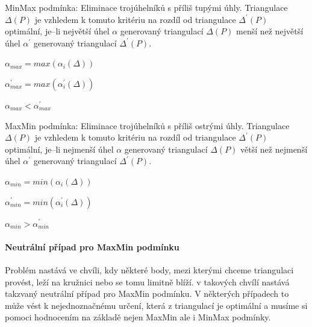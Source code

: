 \documentclass[12pt,a4paper]{article}
\begin{document}
MinMax podmínka:
Eliminace trojúhelníků s příliš tupými úhly. Triangulace $\Delta(P)$ je vzhledem k tomuto kritériu na rozdíl od triangulace $\Delta^{'}(P)$ optimální, je–li největší úhel $\alpha$ generovaný triangulací $\Delta(P)$ menší než největší úhel $\alpha^{'}$ generovaný triangulací $\Delta^{'}(P)$.

$\alpha_{max} = max(\alpha_i(\Delta))$

$\alpha^{'}_{max} = max(\alpha_i^{'}(\Delta))$

$\alpha_{max} < \alpha^{'}_{max}$

\bigskip
MaxMin podmínka:
Eliminace trojúhelníků s příliš ostrými úhly. Triangulace $\Delta(P)$ je vzhledem k tomuto kritériu na rozdíl od triangulace $\Delta^{'}(P)$ optimální, je–li nejmenší úhel $\alpha$ generovaný triangulací $\Delta(P)$ větší než nejmenší úhel $\alpha^{'}$ generovaný triangulací $\Delta^{'}(P)$.

$\alpha_{min} = min(\alpha_i(\Delta))$

$\alpha^{'}_{min} = min(\alpha_i^{'}(\Delta))$

$\alpha_{min} > \alpha^{'}_{min}$

\paragraph{Neutrální případ pro MaxMin podmínku}

Problém nastává ve chvíli, kdy některé body, mezi kterými chceme triangulaci provést, leží na kružnici nebo se tomu limitně blíží. v takových chvílí nastává takzvaný neutrální případ pro MaxMin podmínku. V některých případech to může vést k nejednoznačnému určení, která z triangulací je optimální a musíme si pomoci hodnocením na základě nejen MaxMin ale i MinMax podmínky.
\end{document}
